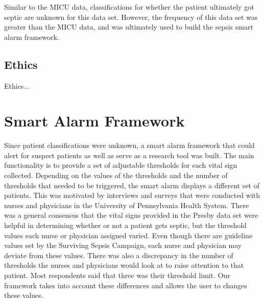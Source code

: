 \documentclass{sig-alternate}
\begin{document}
Similar to the MICU data, classifications for whether the patient ultimately got septic are unknown for this data set.  However, the frequency of this data set was greater than the MICU data, and was ultimately used to build the sepsis smart alarm framework.  

\subsection{Ethics}
\label{subsec:ethics}
\vspace{10pt}

Ethics...

\section{Smart Alarm Framework}
\vspace{10pt}
\label{sec:framework}

Since patient classifications were unknown, a smart alarm framework that could alert for suspect patients as well as serve as a research tool was built.  The main functionality is to provide a set of adjustable thresholds for each vital sign collected.  Depending on the values of the thresholds and the number of thresholds that needed to be triggered, the smart alarm displays a different set of patients.  This was motivated by interviews and surveys that were conducted with nurses and physicians in the University of Pennsylvania Health System.  There was a general consensus that the vital signs provided in the Presby data set were helpful in determining whether or not a patient gets septic, but the threshold values each nurse or physician assigned varied.  Even though there are guideline values set by the Surviving Sepsis Campaign, each nurse and physician may deviate from these values.  There was also a discrepancy in the number of thresholds the nurses and physicians would look at to raise attention to that patient.  Most respondents said that three was their threshold limit.  Our framework takes into account these differences and allows the user to changes these values.
\end{document}
